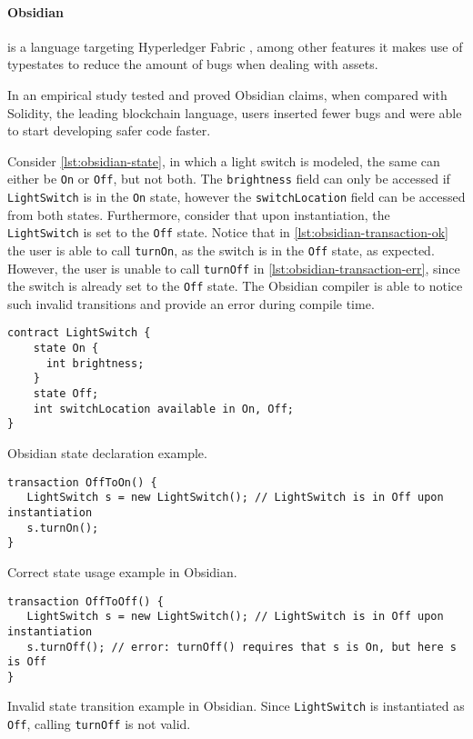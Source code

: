 \paragraph{Obsidian} is a language targeting Hyperledger Fabric \autocite{Fabric2021},
among other features it makes use of typestates to reduce the amount of bugs when dealing with assets.

In \autocite{Coblenz2020} an empirical study tested and proved Obsidian claims,
when compared with Solidity, the leading blockchain language,
users inserted fewer bugs and were able to start developing safer code faster.

Consider \autoref{lst:obsidian-state}, in which a light switch is modeled,
the same can either be \texttt{On} or \texttt{Off}, but not both.
The \texttt{brightness} field can only be accessed if \texttt{LightSwitch} is in the \texttt{On} state,
however the \texttt{switchLocation} field can be accessed from both states.
Furthermore, consider that upon instantiation, the \texttt{LightSwitch} is set to the \texttt{Off} state.
Notice that in \autoref{lst:obsidian-transaction-ok} the user is able to call \texttt{turnOn},
as the switch is in the \texttt{Off} state, as expected.
However, the user is unable to call \texttt{turnOff} in \autoref{lst:obsidian-transaction-err},
since the switch is already set to the \texttt{Off} state.
The Obsidian compiler is able to notice such invalid transitions and provide an error during compile time.

\begin{listing}
    \centering
    \begin{verbatim}
contract LightSwitch {
    state On {
      int brightness;
    }
    state Off;
    int switchLocation available in On, Off;
}
    \end{verbatim}
    \caption{Obsidian state declaration example.}
    \label{lst:obsidian-state}
\end{listing}

\begin{listing}
    \centering
    \begin{verbatim}
transaction OffToOn() {
   LightSwitch s = new LightSwitch(); // LightSwitch is in Off upon instantiation
   s.turnOn();
}
    \end{verbatim}
    \caption{Correct state usage example in Obsidian.}
    \label{lst:obsidian-transaction-ok}
\end{listing}

\begin{listing}
    \centering
    \begin{verbatim}
transaction OffToOff() {
   LightSwitch s = new LightSwitch(); // LightSwitch is in Off upon instantiation
   s.turnOff(); // error: turnOff() requires that s is On, but here s is Off
}
    \end{verbatim}
    \caption{Invalid state transition example in Obsidian. Since \texttt{LightSwitch} is instantiated as \texttt{Off}, calling \texttt{turnOff} is not valid.}
    \label{lst:obsidian-transaction-err}
\end{listing}

